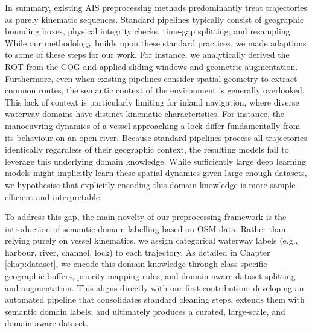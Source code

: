 


In summary, existing \ac{AIS} preprocessing methods predominantly treat trajectories as purely kinematic sequences.
Standard pipelines typically consist of geographic bounding boxes, physical integrity checks, time-gap splitting, and resampling. While our methodology builds upon these standard practices, we made adaptions to some of these steps for our work. For instance, we analytically derived the \ac{ROT} from the \ac{COG} and applied sliding windows and geometric augmentation.
Furthermore, even when existing pipelines consider spatial geometry to extract common routes, the semantic context of the environment is generally overlooked. This lack of context is particularly limiting for inland navigation, where diverse waterway domains have distinct kinematic characteristics. For instance, the manoeuvring dynamics of a vessel approaching a lock differ fundamentally from its behaviour on an open river. Because standard pipelines process all trajectories identically regardless of their geographic context, the resulting models fail to leverage this underlying domain knowledge. While sufficiently large deep learning models might implicitly learn these spatial dynamics given large enough datasets, we hypothesise that explicitly encoding this domain knowledge is more sample-efficient and interpretable.

To address this gap, the main novelty of our preprocessing framework is the introduction of semantic domain labelling based on \ac{OSM} data. Rather than relying purely on vessel kinematics, we assign categorical waterway labels (e.g., harbour, river, channel, lock) to each trajectory. As detailed in Chapter \ref{chap:dataset}, we encode this domain knowledge through class-specific geographic buffers, priority mapping rules, and domain-aware dataset splitting and augmentation. This aligns directly with our first contribution: developing an automated pipeline that consolidates standard cleaning steps, extends them with semantic domain labels, and ultimately produces a curated, large-scale, and domain-aware dataset.


